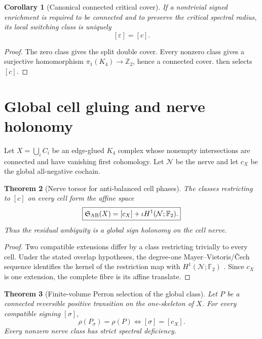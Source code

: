 \documentclass[11pt,oneside,openany]{book}
\numberwithin{equation}{chapter}
\newtheorem{theorem}{Theorem}[chapter]
\newtheorem{corollary}[theorem]{Corollary}
\theoremstyle{definition}
\theoremstyle{remark}
\newcommand{\Ftwo}{\mathbb F_2}
\newcommand{\Ztwo}{\mathbb Z_2}
\begin{document}
\begin{corollary}[Canonical connected critical cover]
\label{cor:canonical-signed-cover}
If a nontrivial signed enrichment is required to be connected and to preserve
the critical spectral radius, its local switching class is uniquely
\[
 \boxed{[\varepsilon]=[c].}
\]
\end{corollary}

\begin{proof}
The zero class gives the split double cover.  Every nonzero class gives a
surjective homomorphism \(\pi_1(K_4)\to\Ztwo\), hence a connected cover.
 then selects \([c]\).
\end{proof}

\section{Global cell gluing and nerve holonomy}

Let \(X=\bigcup_iC_i\) be an edge-glued \(K_4\) complex whose nonempty
intersections are connected and have vanishing first cohomology.  Let
\(\mathcal N\) be the nerve and let \(c_X\) be the global all-negative
cochain.

\begin{theorem}[Nerve torsor for anti-balanced cell phases]
\label{thm:nerve-torsor}
The classes restricting to \([c]\) on every cell form the affine space
\[
 \boxed{
 \mathfrak S_{\rm AB}(X)
 =[c_X]+\iota H^1(\mathcal N;\Ftwo).}
\]
Thus the residual ambiguity is a global sign holonomy on the cell nerve.
\end{theorem}

\begin{proof}
Two compatible extensions differ by a class restricting trivially to every
cell.  Under the stated overlap hypotheses, the degree-one
Mayer--Vietoris/\v Cech sequence identifies the kernel of the restriction map
with \(H^1(\mathcal N;\Ftwo)\) \cite{Hatcher2002}.  Since \(c_X\) is one
extension, the complete fibre is its affine translate.
\end{proof}

\begin{theorem}[Finite-volume Perron selection of the global class]
\label{thm:global-perron-selection}
Let \(P\) be a connected reversible positive transition on the one-skeleton
of \(X\).  For every compatible signing \([\sigma]\),
\[
 \boxed{
 \rho(P_\sigma)=\rho(P)
 \iff
 [\sigma]=[c_X].}
\]
Every nonzero nerve class has strict spectral deficiency.
\end{theorem}
\end{document}
